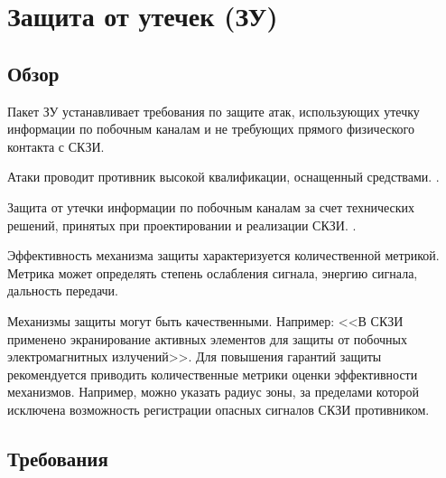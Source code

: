 \section{Защита от утечек (ЗУ)}\label{NI}

\subsection{Обзор}\label{NI.Intro}

Пакет ЗУ устанавливает требования по защите  атак, 
использующих утечку информации по побочным каналам и не требующих прямого 
физического контакта с СКЗИ.

Атаки проводит противник высокой квалификации, оснащенный 
 средствами. 
.

Защита от утечки информации по побочным каналам  
за счет технических решений, принятых при проектировании и реализации 
СКЗИ. . 
%

Эффективность механизма защиты характеризуется количественной метрикой.
Метрика может определять степень ослабления сигнала, энергию сигнала, 
дальность передачи.
%

Механизмы защиты могут быть качественными. Например: 
<<В СКЗИ применено экранирование активных элементов для защиты от побочных 
электромагнитных излучений>>. 
%
Для повышения гарантий защиты рекомендуется приводить количественные метрики 
оценки эффективности механизмов. Например, можно указать радиус зоны, 
за пределами которой исключена возможность регистрации опасных сигналов 
СКЗИ противником.
\fi

\subsection{Требования}\label{NI.Reqs}

